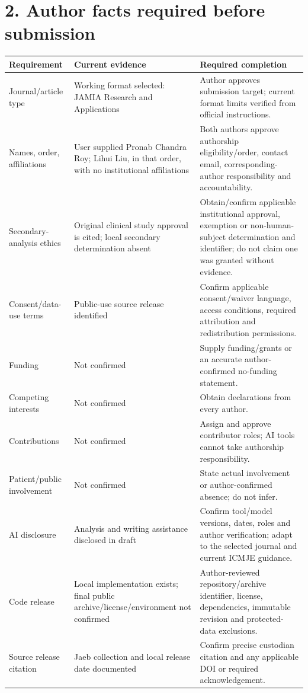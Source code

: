 \documentclass[11pt,a4paper]{article}
\begin{document}
\section*{2. Author facts required before submission}
{\small
\setlength{\tabcolsep}{3pt}
\begin{longtable}{>{\raggedright\arraybackslash}p{}>{\raggedright\arraybackslash}p{}>{\raggedright\arraybackslash}p{}}
\toprule
\textbf{Requirement} & \textbf{Current evidence} & \textbf{Required completion} \\ \midrule
\endhead
Journal/article type & Working format selected: JAMIA Research and Applications & Author approves submission target; current format limits verified from official instructions. \\
Names, order, affiliations & User supplied Pronab Chandra Roy; Lihui Liu, in that order, with no institutional affiliations & Both authors approve authorship eligibility/order, contact email, corresponding-author responsibility and accountability. \\
Secondary-analysis ethics & Original clinical study approval is cited; local secondary determination absent & Obtain/confirm applicable institutional approval, exemption or non-human-subject determination and identifier; do not claim one was granted without evidence. \\
Consent/data-use terms & Public-use source release identified & Confirm applicable consent/waiver language, access conditions, required attribution and redistribution permissions. \\
Funding & Not confirmed & Supply funding/grants or an accurate author-confirmed no-funding statement. \\
Competing interests & Not confirmed & Obtain declarations from every author. \\
Contributions & Not confirmed & Assign and approve contributor roles; AI tools cannot take authorship responsibility. \\
Patient/public involvement & Not confirmed & State actual involvement or author-confirmed absence; do not infer. \\
AI disclosure & Analysis and writing assistance disclosed in draft & Confirm tool/model versions, dates, roles and author verification; adapt to the selected journal and current ICMJE guidance. \\
Code release & Local implementation exists; final public archive/license/environment not confirmed & Author-reviewed repository/archive identifier, license, dependencies, immutable revision and protected-data exclusions. \\
Source release citation & Jaeb collection and local release date documented & Confirm precise custodian citation and any applicable DOI or required acknowledgement. \\
\bottomrule
\end{longtable}
}
\end{document}
